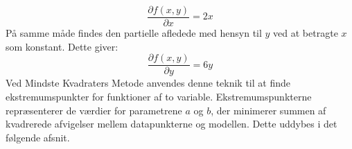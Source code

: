 \begin{equation}\frac{\partial f(x,y)}{\partial x} = 2x\end{equation}
På samme måde findes den partielle afledede med hensyn til $y$ ved at betragte $x$ som konstant. Dette giver:
\begin{equation}\frac{\partial f(x,y)}{\partial y} = 6y\end{equation}
Ved Mindste Kvadraters Metode anvendes denne teknik til at finde ekstremumspunkter for funktioner af to variable. Ekstremumspunkterne repræsenterer de værdier for parametrene $a$ og $b$, der minimerer summen af kvadrerede afvigelser mellem datapunkterne og modellen. Dette uddybes i det følgende afsnit.


\newpage
